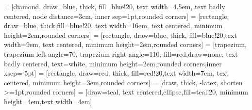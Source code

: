 
 = [diamond, draw=blue, thick, fill=blue!20, 
    text width=4.5em, text badly centered, node distance=3cm, inner sep=1pt,rounded corners]
 = [rectangle, draw=blue, thick,fill=blue!20, text width=16em, text centered, minimum height=2em,rounded corners]
 = [rectangle, draw=blue, thick, fill=blue!20,text width=9em, text centered, minimum height=2em,rounded corners]
 = [trapezium, trapezium left angle=70, trapezium right angle=110, fill=red,draw=none, text badly centered, text=white, minimum height=2em,rounded corners,inner xsep=-5pt]
 = [rectangle, draw=red, thick, fill=red!20,text width=7em, text centered, minimum height=3em,rounded corners]
 = [draw, thick, -latex, shorten >=1pt,rounded corners]
 = [draw=teal, text centered,ellipse,fill=teal!20,
    minimum height=4em,text width=4em]
    
